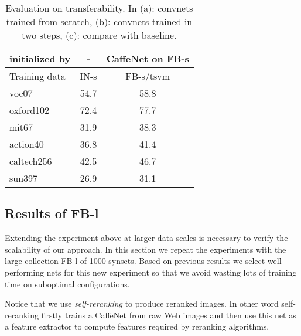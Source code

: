 \documentclass[preprint,12pt]{elsarticle}
\begin{document}
\begin{table}[!t]
{\begin{centering}
\begin{tabular}{l|cc}
initialized by & - & CaffeNet on FB-s \tabularnewline
 \hline
Training data & IN-s & FB-s/tsvm \tabularnewline
\hline\hline
voc07 & 54.7 & 58.8 \tabularnewline
oxford102 & 72.4 & 77.7 \tabularnewline
mit67 & 31.9 & 38.3 \tabularnewline 
action40 & 36.8 & 41.4 \tabularnewline
caltech256 & 42.5 & 46.7 \tabularnewline
sun397 & 26.9 & 31.1 \tabularnewline
\end{tabular}
\par\end{centering}
\label{table:acc_IN-s_compare_3rd}}
\caption{Evaluation on transferability. In (a): convnets trained from scratch, (b): convnets trained in two steps, (c): compare with baseline.}
\label{table:transfer_100}
\end{table}
\subsection{Results of FB-l}\label{sec:fb1k}
\noindent Extending the experiment above at larger data scales is necessary to verify the scalability of our approach. In this section we repeat the experiments with the large collection FB-l of 1000 synsets. Based on previous results we select well performing nets for this new experiment so that we avoid wasting lots of training time on suboptimal configurations. 

Notice that we use \emph{self-reranking} to produce reranked images. In other word  self-reranking firstly trains a CaffeNet from raw Web images and then use this net as a feature extractor to compute features required by reranking algorithms. 
\end{document}
